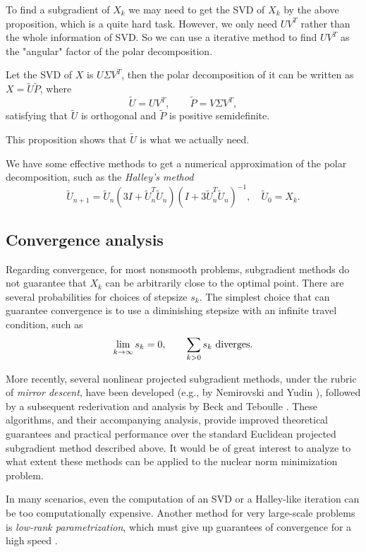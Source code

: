 \documentclass[11pt]{article}
\begin{document}
To find a subgradient of \(X_k\) we may need to get the SVD of \(X_k\) by the above proposition, which is a quite hard task. However, we only need \(UV^T\) rather than the whole information of SVD. So we can use a iterative method to find \(UV^T\) as the "angular" factor of the polar decomposition.

\begin{proposition}
    Let the SVD of \(X\) is \(U\Sigma V^T\), then the polar decomposition of it can be written as \(X=\tilde{U} \tilde{P}\), where
    \[\tilde{U}=U V^T,\qquad \tilde{P}=V\Sigma V^T,\]
    satisfying that \(\tilde{U}\) is orthogonal and \(\tilde{P}\) is positive semidefinite.
\end{proposition}

This proposition shows that \(\tilde{U}\) is what we actually need.

We have some effective methods to get a numerical approximation of the polar decomposition, such as the \emph{Halley's method}\cite{nakatsukasa2010optimizing}
\[\tilde{U}_{n+1} = \tilde{U}_{n}\left(3 I+\tilde{U}_{n}^{T} \tilde{U}_{n}\right)\left(I+3 \tilde{U}_{n}^{T} \tilde{U}_{n}\right)^{-1}, \quad \tilde{U}_{0}=X_k.\] 
\subsection{Convergence analysis}
Regarding convergence, for most nonsmooth problems, subgradient methods do not guarantee that \(X_k\) can be arbitrarily close to the optimal point. There are several probabilities for choices of stepsize \(s_k\). The simplest choice that can guarantee convergence is to use a diminishing stepsize with an infinite travel condition, such as 
\[ \lim_{k\to \infty} s_k=0,\qquad \sum_{k>0}s_k\textnormal{ diverges}.\]

More recently, several nonlinear projected subgradient methods, under the rubric of \emph{mirror descent}, have been developed (e.g., by Nemirovski and Yudin \cite{blair1985problem}), followed by a subsequent rederivation and analysis by Beck and Teboulle \cite{beck2003mirror}. These algorithms, and their accompanying analysis, provide improved theoretical guarantees and practical performance over the standard Euclidean projected subgradient method described above. It would be of great interest to analyze to what extent these methods can be applied to the nuclear norm minimization problem.

In many scenarios, even the computation of an SVD or a Halley-like iteration can be too computationally expensive. Another method for  very large-scale problems is \emph{low-rank parametrization}, which  must give up guarantees of convergence for a high speed \cite{recht2010guaranteed}.
\end{document}
